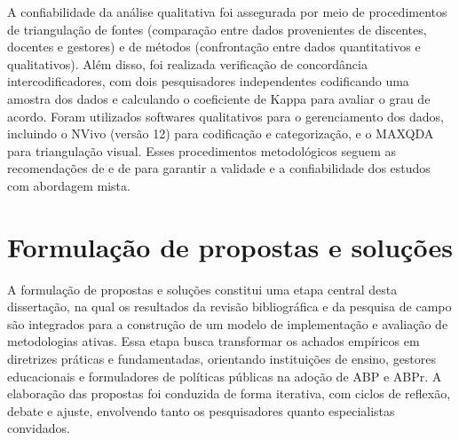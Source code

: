 A confiabilidade da análise qualitativa foi assegurada por meio de procedimentos de triangulação de fontes (comparação entre dados provenientes de discentes, docentes e gestores) e de métodos (confrontação entre dados quantitativos e qualitativos). Além disso, foi realizada verificação de concordância intercodificadores, com dois pesquisadores independentes codificando uma amostra dos dados e calculando o coeficiente de Kappa para avaliar o grau de acordo. Foram utilizados softwares qualitativos para o gerenciamento dos dados, incluindo o NVivo (versão 12) para codificação e categorização, e o MAXQDA para triangulação visual. Esses procedimentos metodológicos seguem as recomendações de \cite{BARDIN2016} e de \cite{CRESWELL2018} para garantir a validade e a confiabilidade dos estudos com abordagem mista.

\section{Formulação de propostas e soluções}
\label{sec:formulacao_propostas}

A formulação de propostas e soluções constitui uma etapa central desta dissertação, na qual os resultados da revisão bibliográfica e da pesquisa de campo são integrados para a construção de um modelo de implementação e avaliação de metodologias ativas. Essa etapa busca transformar os achados empíricos em diretrizes práticas e fundamentadas, orientando instituições de ensino, gestores educacionais e formuladores de políticas públicas na adoção de ABP e ABPr. A elaboração das propostas foi conduzida de forma iterativa, com ciclos de reflexão, debate e ajuste, envolvendo tanto os pesquisadores quanto especialistas convidados.

